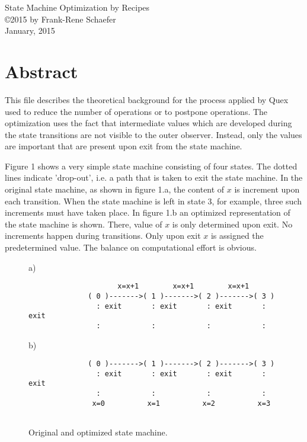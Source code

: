 \documentclass[12pt,a4paper]{scrartcl}
\begin{document}
\begin{center}
{\large State Machine Optimization by Recipes} \\ 
\copyright 2015 by Frank-Rene Schaefer         \\
January, 2015
\end{center}

%
\section{Abstract}

This file describes the theoretical background for the process applied by Quex
used to reduce the number of operations or to postpone operations.  The
optimization uses the fact that intermediate values which are developed during
the state transitions are not visible to the outer observer. Instead, only the
values are important that are present upon exit from the state machine.

Figure 1 shows a very simple state machine consisting of four states.  The
dotted lines indicate 'drop-out', i.e. a path that is taken to exit the state
machine.  In the original state machine, as shown in figure 1.a, the content of
$x$ is increment upon each transition. When the state machine is left in state
3, for example, three such increments must have taken place. In figure 1.b an
optimized representation of the state machine is shown.  There, value of $x$ is
only determined upon exit.  No increments happen during transitions. Only upon
exit $x$ is assigned the predetermined value. The balance on computational
effort is obvious.

\begin{figure}[htbp] \leavevmode
a)
\begin{verbatim}
                     x=x+1        x=x+1        x=x+1
              ( 0 )------->( 1 )------->( 2 )------->( 3 )
                : exit       : exit       : exit       : exit
                :            :            :            :
\end{verbatim}
    
b)
\begin{verbatim}
              ( 0 )------->( 1 )------->( 2 )------->( 3 )
                : exit       : exit       : exit       : exit
                :            :            :            :
               x=0          x=1          x=2          x=3
    
\end{verbatim}
\caption{Original and optimized state machine.}
\end{figure}
                 
\end{document}
